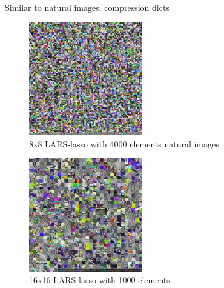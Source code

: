 Similar to natural images.
compression dicts

\begin{figure}[h]
\centering
\includegraphics[width = 0.44\textwidth]{images/8_4000_10000_10_lasso.png} 
\caption{8x8 LARS-lasso with 4000 elements natural images}
\label{fig:8_4000_lasso}
\end{figure}


\begin{figure}[h]
\centering
\includegraphics[width = 0.44\textwidth]{images/16_1000_1000_10_lasso.png}
\caption{16x16 LARS-lasso with 1000 elements}
\label{fig:16_1000_lasso}
\end{figure}


